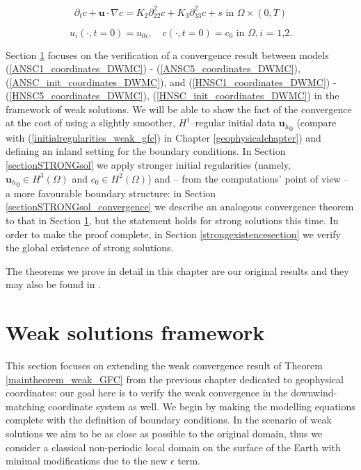 \documentclass[12pt]{report}
\numberwithin{theorem}{chapter}
\numberwithin{corollary}{chapter}
\numberwithin{lemma}{chapter}
\numberwithin{remark}{chapter}
\numberwithin{definition}{chapter}
\numberwithin{prop}{chapter}
\begin{document}
\begin{equation} \label{HNSC5_coordinates_DWMC}   
  \partial_t c + \mathbf{u} \cdot \nabla c = K_2 \partial_{22} ^ 2 c + K_3 \partial_{33} ^2 c + s \text{ in } \Omega \times (0,T)
\end{equation}

\begin{equation} \label{HNSC_init_coordinates_DWMC}   
  u_i (\cdot, t=0) = u_{0 i}, \quad c (\cdot, t=0) = c_0 \text{ in } \Omega, \text{$i$ = 1,2}.
\end{equation}

Section \ref{sectionWS_dwmc} focuses on the verification of a convergence result between models (\ref{ANSC1_coordinates_DWMC}) - (\ref{ANSC5_coordinates_DWMC}), (\ref{ANSC_init_coordinates_DWMC}), and (\ref{HNSC1_coordinates_DWMC}) - (\ref{HNSC5_coordinates_DWMC}), (\ref{HNSC_init_coordinates_DWMC}) in the framework of weak solutions. We will be able to show the fact of the convergence at the cost of using a slightly smoother, $H^1$--regular initial data ${\mathbf{u}_h}_0$ (compare with (\ref{initialregularities_weak_gfc}) in Chapter \ref{geophysicalchapter}) and defining an inland setting for the boundary conditions. In Section \ref{sectionSTRONGsol} we apply stronger initial regularities (namely, ${\mathbf{u}_h}_0 \in H^3(\Omega)$ and $c_0 \in H^2(\Omega)$) and -- from the computations' point of view -- a more favourable boundary structure: in Section \ref{sectionSTRONGsol_convergence} we describe an analogous convergence theorem to that in Section \ref{sectionWS_dwmc}, but the statement holds for strong solutions this time. In order to make the proof complete, in Section \ref{strongexistencesection} we verify the global existence of strong solutions.

The theorems we prove in detail in this chapter are our original results and they may also be found in \cite{dwmhydro2020}.

\section{Weak solutions framework} \label{sectionWS_dwmc}

This section focuses on extending the weak convergence result of Theorem \ref{maintheorem_weak_GFC} from the previous chapter dedicated to geophysical coordinates: our goal here is to verify the weak convergence in the downwind-matching coordinate system as well. We begin by making the modelling equations complete with the definition of boundary conditions. In the scenario of weak solutions we aim to be as close as possible to the original domain, thus we consider a classical non-periodic local domain on the surface of the Earth with minimal modifications due to the new $\epsilon$ term.
\end{document}
